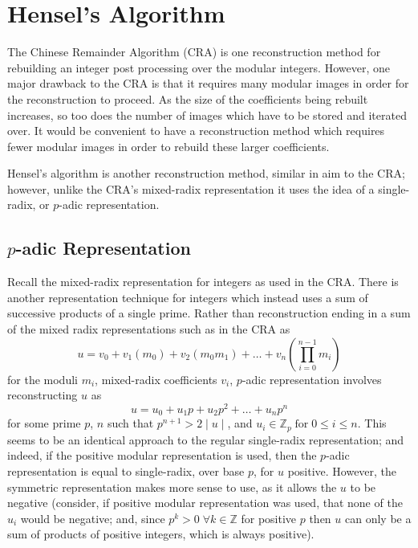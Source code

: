 \documentclass[letterpaper,12pt,titlepage,oneside,final]{book}
\begin{document}
\section{Hensel's Algorithm}

The Chinese Remainder Algorithm (CRA) is one reconstruction method for rebuilding an integer post processing over the modular integers.  However, one major drawback to the CRA is that it requires many modular images in order for the reconstruction to proceed.  As the size of the coefficients being rebuilt increases, so too does the number of images which have to be stored and iterated over.  It would be convenient to have a reconstruction method which requires fewer modular images in order to rebuild these larger coefficients.   

Hensel's algorithm is another reconstruction method, similar in aim to the CRA; however, unlike the CRA's mixed-radix representation it uses the idea of a single-radix, or ${p}$-adic representation.

\subsection{${p}$-adic Representation}

Recall the mixed-radix representation for integers as used in the CRA.  There is another representation technique for integers which instead uses a sum of successive products of a single prime.  Rather than reconstruction ending in a sum of the mixed radix representations such as in the CRA as
\begin{equation*}
  u = v_0 + v_1(m_0) + v_2(m_0m_1) + \ldots + v_n(\prod_{i=0}^{n-1}m_i)
\end{equation*}
for the moduli ${m_i}$, mixed-radix coefficients ${v_i}$, ${p}$-adic representation involves reconstructing ${u}$ as 
\begin{equation*}
  u = u_0 + u_1p + u_2p^2 + \ldots + u_np^n
\end{equation*}
for some prime ${p}$, ${n}$ such that ${p^{n+1} > 2 \mid u \mid}$, and ${u_i \in \mathbb{Z}_p \; \textrm{for}\; 0 \leq i \leq n}$.  This seems to be an identical approach to the regular single-radix representation; and indeed, if the positive modular representation is used, then the ${p}$-adic representation is equal to single-radix, over base ${p}$, for ${u}$ positive.  However, the symmetric representation makes more sense to use, as it allows the ${u}$ to be negative (consider, if positive modular representation was used, that none of the ${u_i}$ would be negative; and, since ${p^k > 0 \; \forall k \in \mathbb{Z}}$ for positive ${p}$ then ${u}$ can only be a sum of products of positive integers, which is always positive).  
\end{document}
